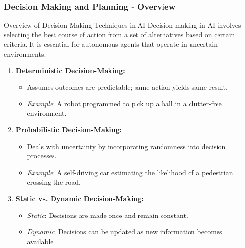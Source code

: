 \documentclass[aspectratio=169]{beamer}
\begin{document}
\begin{frame}[fragile]
    \frametitle{Decision Making and Planning - Overview}
    \begin{block}{Overview of Decision-Making Techniques in AI}
        Decision-making in AI involves selecting the best course of action from a set of alternatives based on certain criteria. It is essential for autonomous agents that operate in uncertain environments.
    \end{block}
    
    \begin{enumerate}
        \item \textbf{Deterministic Decision-Making:}
            \begin{itemize}
                \item Assumes outcomes are predictable; same action yields same result.
                \item \textit{Example}: A robot programmed to pick up a ball in a clutter-free environment.
            \end{itemize}
        
        \item \textbf{Probabilistic Decision-Making:}
            \begin{itemize}
                \item Deals with uncertainty by incorporating randomness into decision processes.
                \item \textit{Example}: A self-driving car estimating the likelihood of a pedestrian crossing the road.
            \end{itemize}
        
        \item \textbf{Static vs. Dynamic Decision-Making:}
            \begin{itemize}
                \item \textit{Static}: Decisions are made once and remain constant.
                \item \textit{Dynamic}: Decisions can be updated as new information becomes available.
            \end{itemize}
    \end{enumerate}
\end{frame}
\end{document}
